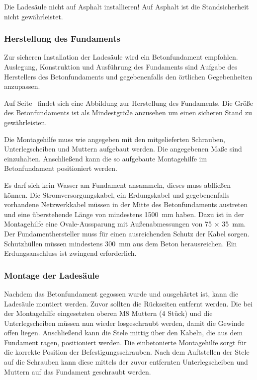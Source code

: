 \documentclass[a4paper,10pt]{article}
\newcommand{\hint}[1]{\begin{tcolorbox}[colback=boxgray,colframe=black,coltext=
white,title=Hinweis]#1\end{tcolorbox}}
\begin{document}
\begin{multicols*}{2}
    \hint{Die Ladesäule nicht auf Asphalt installieren! Auf Asphalt ist die
	Standsicherheit nicht gewährleistet.}


	\subsubsection{Herstellung des Fundaments}
    Zur sicheren Installation der Ladesäule wird ein Betonfundament empfohlen.
	Auslegung, Konstruktion und Ausführung des Fundaments sind Aufgabe des
	Herstellers des Betonfundaments und gegebenenfalls den örtlichen Gegebenheiten
	anzupassen.

	Auf Seite~\pageref{appendix_base} findet sich eine
	Abbildung zur Herstellung des Fundaments. Die Größe des Betonfundaments ist als
	Mindestgröße anzusehen um einen sicheren Stand zu gewährleisten.

	Die Montagehilfe muss wie angegeben mit den mitgelieferten Schrauben,
	Unterlegscheiben und Muttern aufgebaut werden. Die angegebenen Maße sind
	einzuhalten. Anschließend kann die so aufgebaute Montagehilfe im
	Betonfundament positioniert werden.

	Es darf sich kein Wasser am Fundament ansammeln, dieses muss abfließen können. Die
	Stromversorgungskabel, ein Erdungskabel und gegebenenfalls vorhandene Netzwerkkabel müssen in der Mitte
	des Betonfundaments austreten und eine überstehende Länge von mindestens
	\SI{1500}{\milli\meter} haben. Dazu ist in der Montagehilfe eine
	Ovale-Aussparung mit Außenabmessungen von 75 × \SI{35}{\milli\meter}.
	Der Fundamenthersteller muss
	für einen ausreichenden Schutz der Kabel sorgen. Schutzhüllen müssen mindestens
	\SI{300}{\milli\meter} aus dem Beton herausreichen. Ein Erdungsanschluss ist
	zwingend erforderlich.

	\subsubsection{Montage der Ladesäule}
	Nachdem das Betonfundament gegossen wurde und ausgehärtet ist, kann
	die Ladesäule montiert werden. Zuvor sollten die Rückseiten
	entfernt werden. Die bei der Montagehilfe
	eingesetzten oberen M8 Muttern (4 Stück) und die Unterlegscheiben müssen nun wieder losgeschraubt werden,
	damit die Gewinde offen liegen. Anschließend kann die Stele mittig über den
	Kabeln, die aus dem Fundament ragen, positioniert werden. Die
	einbetonierte Montagehilfe sorgt für die korrekte Position der
	Befestigungsschrauben. Nach dem Auftstellen der Stele auf die Schrauben kann diese
	mittels der zuvor entfernten Unterlegscheiben und Muttern auf das Fundament
	geschraubt werden.


\end{multicols*}
\end{document}
